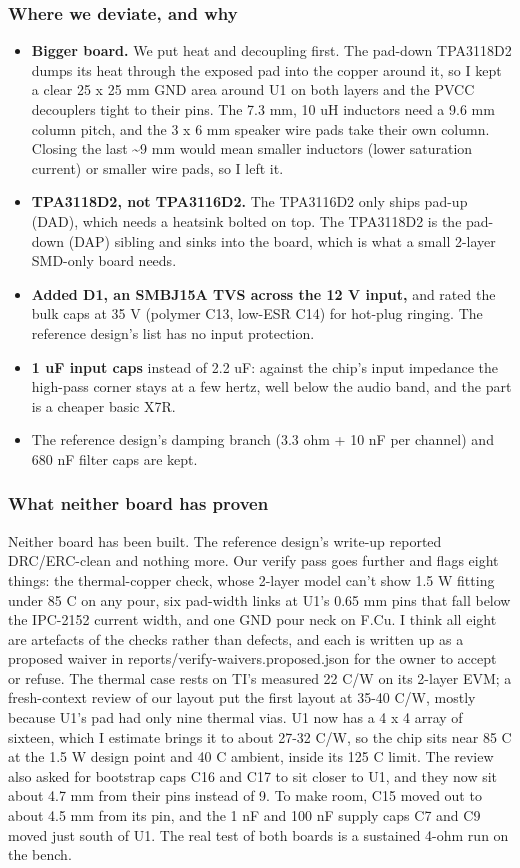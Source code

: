 \documentclass[11pt]{article}
\begin{document}
\subsubsection*{Where we deviate, and why}
\begin{itemize}
\item \textbf{Bigger board.} We put heat and decoupling first. The pad-down TPA3118D2 dumps its heat through
the exposed pad into the copper around it, so I kept a clear 25 x 25 mm GND area around U1 on both
layers and the PVCC decouplers tight to their pins. The 7.3 mm, 10 uH inductors need a 9.6 mm column
pitch, and the 3 x 6 mm speaker wire pads take their own column. Closing the last \textasciitilde{}9 mm would mean
smaller inductors (lower saturation current) or smaller wire pads, so I left it.
\item \textbf{TPA3118D2, not TPA3116D2.} The TPA3116D2 only ships pad-up (DAD), which needs a heatsink bolted
on top. The TPA3118D2 is the pad-down (DAP) sibling and sinks into the board, which is what a
small 2-layer SMD-only board needs.
\item \textbf{Added D1, an SMBJ15A TVS across the 12 V input,} and rated the bulk caps at 35 V (polymer C13,
low-ESR C14) for hot-plug ringing. The reference design's list has no input protection.
\item \textbf{1 uF input caps} instead of 2.2 uF: against the chip's input impedance the high-pass corner
stays at a few hertz, well below the audio band, and the part is a cheaper basic X7R.
\item The reference design's damping branch (3.3 ohm + 10 nF per channel) and 680 nF filter caps are kept.
\end{itemize}
\subsubsection*{What neither board has proven}
Neither board has been built. The reference design's write-up reported DRC/ERC-clean and nothing more. Our verify pass goes further and flags eight things: the thermal-copper check, whose 2-layer model can't show 1.5 W fitting under 85 C on any pour, six pad-width links at U1's 0.65 mm pins that fall below the IPC-2152 current width, and one GND pour neck on F.Cu. I think all eight are artefacts of the checks rather than defects, and each is written up as a proposed waiver in reports/verify-waivers.proposed.json for the owner to accept or refuse. The thermal case rests on TI's measured 22 C/W on its 2-layer EVM; a fresh-context review of our layout put the first layout at 35-40 C/W, mostly because U1's pad had only nine thermal vias. U1 now has a 4 x 4 array of sixteen, which I estimate brings it to about 27-32 C/W, so the chip sits near 85 C at the 1.5 W design point and 40 C ambient, inside its 125 C limit. The review also asked for bootstrap caps C16 and C17 to sit closer to U1, and they now sit about 4.7 mm from their pins instead of 9. To make room, C15 moved out to about 4.5 mm from its pin, and the 1 nF and 100 nF supply caps C7 and C9 moved just south of U1. The real test of both boards is a sustained 4-ohm run on the bench.
\end{document}
